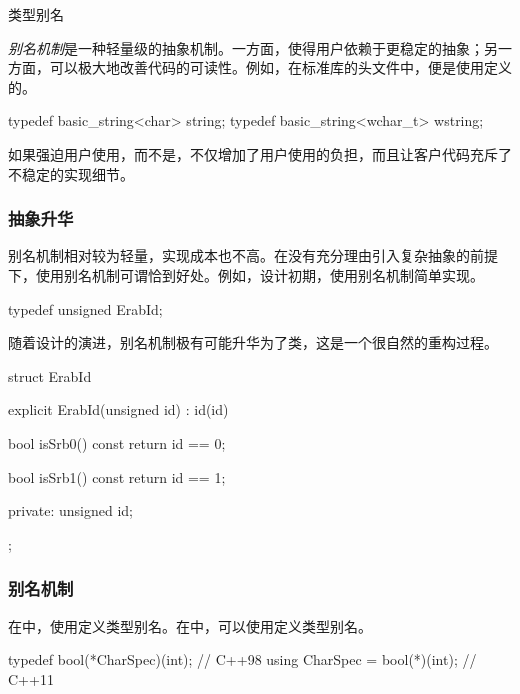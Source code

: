 \begin{content}
\begin{episode}{类型别名}
\begin{content}
\emph{别名机制}是一种轻量级的抽象机制。一方面，使得用户依赖于更稳定的抽象；另一方面，可以极大地改善代码的可读性。例如，在标准库的头文件中，便是使用定义的。

\begin{c++}[title={\ttfamily{标准库: std::string与std::wstring}}]
typedef basic_string<char> string;
typedef basic_string<wchar_t> wstring;
\end{c++}

如果强迫用户使用，而不是，不仅增加了用户使用的负担，而且让客户代码充斥了不稳定的实现细节。

\subsubsection{抽象升华}

别名机制相对较为轻量，实现成本也不高。在没有充分理由引入复杂抽象的前提下，使用别名机制可谓恰到好处。例如，设计初期，使用别名机制简单实现。

\begin{c++}[title={\ttfamily{设计初期: 建议客户使用pass-by-const-reference传递ErabId}}]
typedef unsigned ErabId; 
\end{c++}

随着设计的演进，别名机制极有可能升华为了类，这是一个很自然的重构过程。

\begin{c++}[title={\ttfamily{设计升华：使用类替代别名机制}}]
struct ErabId {
  explicit ErabId(unsigned id) : id(id) {
  }

  bool isSrb0() const {
    return id == 0;
  }

  bool isSrb1() const {
    return id == 1;
  }

private:
  unsigned id;
};
\end{c++}

\subsubsection{别名机制}

在中，使用定义类型别名。在中，可以使用定义类型别名。

\begin{c++}[title={\ttfamily{别名机制：函数指针}}]
typedef bool(*CharSpec)(int);     // C++98
using CharSpec = bool(*)(int);    // C++11
\end{c++}


\end{content}
\end{episode}
\end{content}
